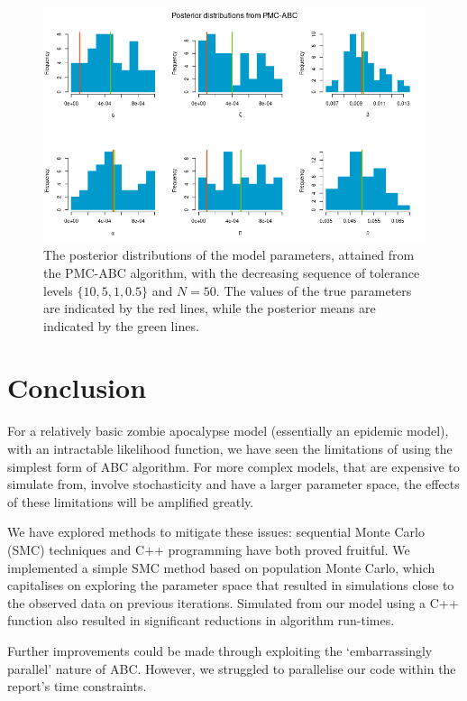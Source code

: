 \documentclass[]{article}
\begin{document}
\begin{figure}[H]
	\centering
	\includegraphics[width=1\linewidth]{../Figures/PMC_posteriors}
	\caption{The posterior distributions of the model parameters, attained from the PMC-ABC algorithm, with the decreasing sequence of tolerance levels $\{ 10, 5, 1, 0.5\}$ and $N=50$. The values of the true parameters are indicated by the red lines, while the posterior means are indicated by the green lines.}
	\label{pmc_abc_posteriors}
\end{figure}

\section{Conclusion}

For a relatively basic zombie apocalypse model (essentially an epidemic model), with an intractable likelihood function, we have seen the limitations of using the simplest form of ABC algorithm. For more complex models, that are expensive to simulate from, involve stochasticity and have a larger parameter space, the effects of these limitations will be amplified greatly. 

We have explored methods to mitigate these issues: sequential Monte Carlo (SMC) techniques and C++ programming have both proved fruitful. We implemented a simple SMC method based on population Monte Carlo, which capitalises on exploring the parameter space that resulted in simulations close to the observed data on previous iterations. Simulated from our model using a C++ function also resulted in significant reductions in algorithm run-times.

Further improvements could be made through exploiting the `embarrassingly parallel' nature of ABC. However, we struggled to parallelise our code within the report's time constraints.
\end{document}
